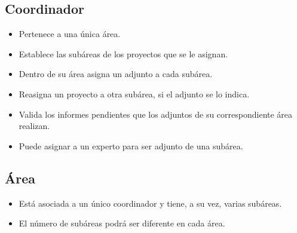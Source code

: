 \documentclass[11pt,a4paper,spanish,twoside]{book}
\begin{document}
\subsection{Coordinador}
\begin{itemize}
\item Pertenece a una única área.
\item Establece las subáreas de los proyectos que se le asignan.
\item Dentro de su área asigna un adjunto a cada subárea.
\item Reasigna un proyecto a otra subárea, si el adjunto se lo indica.
\item Valida los informes pendientes que los adjuntos de su correspondiente 
  área realizan.
\item Puede asignar a un experto para ser adjunto de una subárea.
\end{itemize}

\subsection{Área}
\begin{itemize}
\item Está asociada a un único coordinador y tiene, a su vez, varias subáreas. 
\item El número de subáreas podrá ser diferente en cada área.
\end{itemize}
\end{document}
